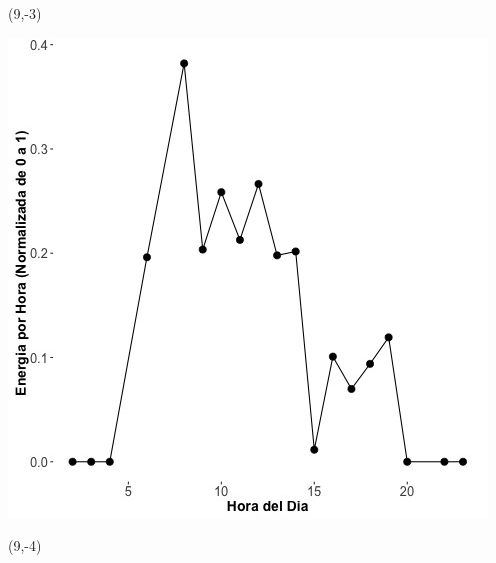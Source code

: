 \documentclass{article}\usepackage[]{graphicx}\usepackage[]{color}
\newenvironment{knitrout}{}{} %
\begin{document}
 \begin{textblock}{1}(9,-3)
\begin{minipage}{20em}
\begingroup

\endgroup
\end{minipage}
\end{textblock}

 \vspace{2cm}

\begin{knitrout}
\color{fgcolor}
\includegraphics[scale=0.75]{figure/A28_fplot_norm_median} 
\end{knitrout}


 \begin{textblock}{1}(9,-4)
\begin{minipage}{20em}
\begingroup

\endgroup
\end{minipage}
\end{textblock}

 \vspace{2cm}
\end{document}
